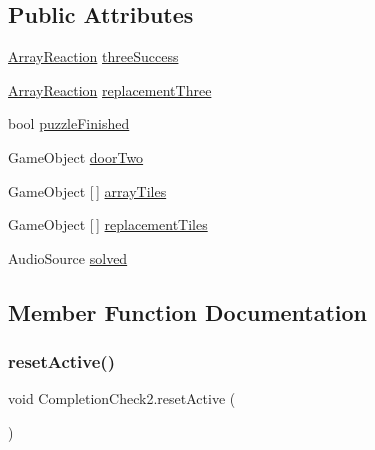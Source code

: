 \subsection*{Public Attributes}
\begin{DoxyCompactItemize}
\item 
\hyperlink{class_array_reaction}{Array\+Reaction} \hyperlink{class_completion_check2_a5304ab78c9a420165fa605e25ac5bdd6}{three\+Success}
\item 
\hyperlink{class_array_reaction}{Array\+Reaction} \hyperlink{class_completion_check2_a56390eb4e63df9107df6f1dbe6b36c34}{replacement\+Three}
\item 
bool \hyperlink{class_completion_check2_a88f888fbd3883fe7c46c6377aedd389d}{puzzle\+Finished}
\item 
Game\+Object \hyperlink{class_completion_check2_a8e504c1480b264be827cce35f4006d7e}{door\+Two}
\item 
Game\+Object \mbox{[}$\,$\mbox{]} \hyperlink{class_completion_check2_a3e576206fcbe2ffdc58b6538b10c57d2}{array\+Tiles}
\item 
Game\+Object \mbox{[}$\,$\mbox{]} \hyperlink{class_completion_check2_a712fc392f7a484070dea22d804bf0ce9}{replacement\+Tiles}
\item 
Audio\+Source \hyperlink{class_completion_check2_ab543e719625d9de2a48b6817c41c3432}{solved}
\end{DoxyCompactItemize}


\subsection{Member Function Documentation}
\mbox{\label{class_completion_check2_acc81070efa47ed19e94287be80bba5da}} 
\subsubsection{\texorpdfstring{reset\+Active()}{resetActive()}}
{\footnotesize\ttfamily void Completion\+Check2.\+reset\+Active (\begin{DoxyParamCaption}{ }\end{DoxyParamCaption})}

\mbox{\label{class_completion_check2_ad02e4fa74bc9dfaf00961746a68d7061}} 
